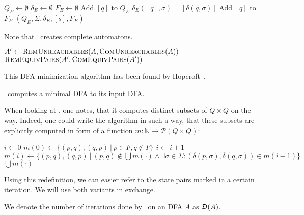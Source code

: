 \begin{enumerate}
	\vspace{0.2cm}
	\begin{algorithmic}[1] \label{ch:1:minmerge}
            \State $Q_E \gets \emptyset$
            \State $\delta_E \gets \emptyset$
            \State $F_E \gets \emptyset$
                \State Add $[q]$ to $Q_E$ 
                    \State $\delta_E([q], \sigma) = [\delta(q, \sigma)]$
                \EndFor
                    \State Add $[q]$ to $F_E$
                \EndIf
            \EndFor
			\State \Return $(Q_E, \Sigma, \delta_E, [s], F_E)$
		\EndFunction
	\end{algorithmic}
	Note that \RemEq\ creates complete automatons.
\end{enumerate}

\vspace{0.2cm}
\begin{algorithmic}[1] \label{ch:1:minalg}
    \State $A' \gets \textsc{RemUnreachables}(A, \textsc{ComUnreachables}(A))$
    \State \Return $\textsc{RemEquivPairs}(A', \textsc{ComEquivPairs}(A'))$
    \EndFunction
\end{algorithmic}
\vspace{0.2cm}
\noindent This DFA minimization algorithm has been found by Hopcroft~\cite{Hop71}.

\begin{theorem}\label{ch:1:min-alg-correct}\textnormal{\cite[pp. 162-164]{HMU01}}
	\MinAlg\ computes a minimal DFA to its input DFA.
\end{theorem}

\noindent When looking at \CompDist, one notes, that it computes distinct subsets of $Q \times Q$ on the way. Indeed, one could write the algorithm in such a way, that these subsets are explicitly computed in form of a function $m\colon\mathbb{N}\to\mathcal{P}(Q\times Q)$:
\vspace{0.2cm}
\begin{algorithmic}[1] \label{ch:1:m-minmark}
	\State $i \gets 0$
	\State $m(0) \gets \{ (p,q), (q,p)\ |\ p \in F, q \notin F \}$
	\Do
		\State $i \gets i + 1$
		\State $m(i) \gets \{ (p,q), (q,p)\ |\ (p,q) \notin \bigcup{m(\cdot)} \land \exists \sigma \in \Sigma \colon (\delta(p,\sigma), \delta(q,\sigma)) \in m(i-1) \}$
	\State \Return $\bigcup{m(\cdot)}$
	\EndFunction
\end{algorithmic}
\vspace{0.2cm}
Using this redefinition, we can easier refer to the state pairs marked in a certain iteration. We will use both variants in exchange.
\begin{definition}
	We denote the number of iterations done by \CompDist\ on an DFA $A$ as $\mathfrak{D}(A)$.
\end{definition}

